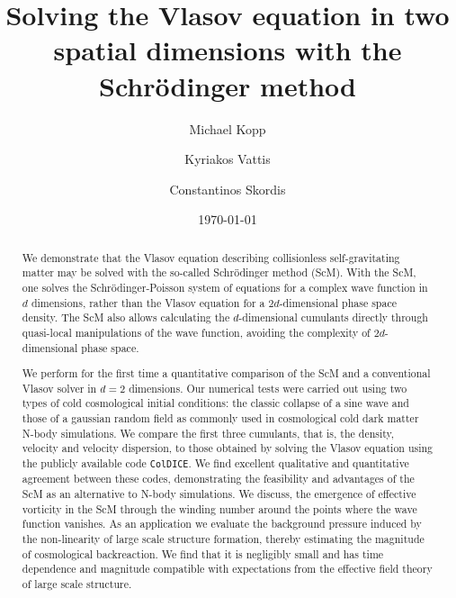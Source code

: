 \documentclass[twocolumn, nofootinbib, showpacs, superscriptaddress]{revtex4-1}
\begin{document}
\title{Solving the Vlasov equation in two spatial dimensions with the Schr\"odinger method} 
\author{Michael Kopp} 
\author{Kyriakos Vattis} 
\author{Constantinos Skordis} 
\date{\today}

\begin{abstract}
We demonstrate that the Vlasov equation describing collisionless self-gravitating matter
 may be solved with the so-called Schr\"odinger method (ScM).  
With the ScM, one solves the Schr\"odinger-Poisson system of equations for a complex wave function in $d$ dimensions, 
rather than the Vlasov equation for a $2d$-dimensional phase space density.
The ScM also allows calculating the $d$-dimensional cumulants directly through quasi-local manipulations of the 
wave function, avoiding the complexity of $2d$-dimensional phase space.

We perform for the first time a quantitative comparison of the ScM and a conventional Vlasov solver in $d=2$ dimensions.
Our numerical tests were carried out using two types of cold cosmological initial conditions: the classic collapse of a sine wave 
and those of a gaussian random field as commonly used in cosmological cold dark matter N-body simulations. 
 We compare the first three cumulants, that is, the density, velocity and velocity dispersion, 
 to those obtained by solving the Vlasov equation using the publicly available code \texttt{ColDICE}. 
 We find excellent qualitative and quantitative agreement between these codes, demonstrating the feasibility 
and advantages of the ScM as an alternative to N-body simulations.
We discuss, the emergence of effective vorticity in the ScM through the winding number around the points where the wave function vanishes.
As an application we evaluate the background pressure induced by the non-linearity of large scale structure formation, thereby estimating the magnitude of cosmological backreaction. We find that it is negligibly small and has time dependence 
and magnitude compatible with expectations from the effective field theory of large scale structure. 
\end{abstract}
\end{document}
